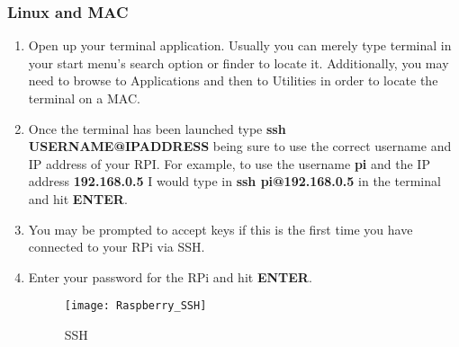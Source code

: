 \documentclass[
a4paper,
fontsize=14pt, %
pagesize, %
parskip=half-, %
]{scrartcl} %
\theoremstyle{mythmstyle} %
\begin{document}
\subsubsection{Linux and MAC}
\begin{enumerate}
    \item Open up your terminal application.  Usually you can merely type terminal in your start menu's search option or finder to locate it.  Additionally, you may need to browse to Applications and then to Utilities in order to locate the terminal on a MAC. 
    \item Once the terminal has been launched type \textbf{ssh USERNAME@IPADDRESS} being sure to use the correct username and IP address of your RPI.  For example, to use the username \textbf{pi} and the IP address \textbf{192.168.0.5} I would type in \textbf{ssh pi@192.168.0.5} in the terminal and hit \textbf{ENTER}.
    \item You may be prompted to accept keys if this is the first time you have connected to your RPi via SSH.
    \item Enter your password for the RPi and hit \textbf{ENTER}.
    \begin{figure}[h]
        \centering\texttt{[image: Raspberry\_SSH]}
        \caption{SSH}
    \end{figure}
\end{enumerate}
\end{document}

